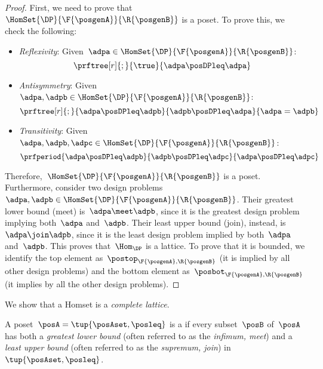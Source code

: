 \begin{proof}
    First, we need to prove that~$\HomSet{\DP}{\F{\posgenA}}{\R{\posgenB}}$ is a poset.
    To prove this, we check the following:
    \begin{itemize}
        \item \emph{Reflexivity}: Given~$\adpa\in \HomSet{\DP}{\F{\posgenA}}{\R{\posgenB}}$:
              \begin{equation*}
                  \prftree[r]{;}{\true}{\adpa\posDPleq \adpa}
              \end{equation*}
        \item \emph{Antisymmetry}: Given~$\adpa,\adpb\in \HomSet{\DP}{\F{\posgenA}}{\R{\posgenB}}$:
              \begin{equation*}
                  \prftree[r]{;}{\adpa\posDPleq \adpb}{\adpb\posDPleq \adpa}{\adpa=\adpb}
              \end{equation*}
        \item \emph{Transitivity}: Given~$\adpa,\adpb,\adpc\in \HomSet{\DP}{\F{\posgenA}}{\R{\posgenB}}$:
              \begin{equation*}
                  \prfperiod{\adpa\posDPleq \adpb}{\adpb\posDPleq \adpc}{\adpa \posDPleq \adpc}
              \end{equation*}
    \end{itemize}
    Therefore,~$\HomSet{\DP}{\F{\posgenA}}{\R{\posgenB}}$ is a poset.
    Furthermore, consider two design problems~$\adpa,\adpb\in \HomSet{\DP}{\F{\posgenA}}{\R{\posgenB}}$.
    Their greatest lower bound (meet) is~$\adpa\meet\adpb$, since it is the greatest design problem implying both~$\adpa$ and~$\adpb$.
    Their least upper bound (join), instead, is~$\adpa\join \adpb$, since it is the least design problem implied by both~$\adpa$ and~$\adpb$.
    This proves that~$\Hom_\DP$ is a lattice.
    To prove that it is bounded, we identify the top element as~$\postop_{\F{\posgenA},\R{\posgenB}}$ (it is implied by all other design problems) and the bottom element as~$\posbot_{\F{\posgenA},\R{\posgenB}}$ (it implies by all the other design problems).
\end{proof}

We show that a \DP Homset is a \emph{complete lattice}.

\begin{definition}
    \label{def:complete-lattice}
    A poset~$\posA=\tup{\posAset,\posleq}$ is a \emph{} if every subset~$\posB$ of~$\posA$ has both a \emph{greatest lower bound} (often referred to as the \emph{infimum, meet}) and a \emph{least upper bound} (often referred to as the \emph{supremum, join}) in~$\tup{\posAset, \posleq}$.
\end{definition}

